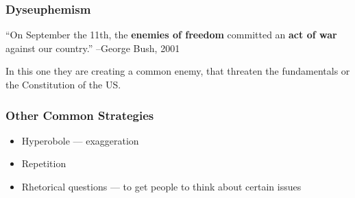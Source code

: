 \documentclass[../main.tex]{subfiles}
\begin{document}
			\subsubsection{Dyseuphemism}
				``On September the 11th, the \textbf{enemies of freedom} committed an \textbf{act of war} against our country.'' --George Bush, 2001 \par
				In this one they are creating a common enemy, that threaten the fundamentals or the Constitution of the US.

			\subsubsection{Other Common Strategies}
				\begin{itemize}
					\item Hyperobole --- exaggeration 
					\item Repetition
					\item Rhetorical questions --- to get people to think about certain issues
				\end{itemize}

\end{document}
